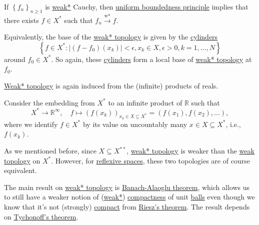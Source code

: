 \begin{note}[Completeness]
	If \(\left\{ f_n \right\}_{n \geq 1}\) is \hyperref[def:weak*-convergence]{weak*} Cauchy, then \hyperref[thm:uniform-boundedness]{uniform boundedness principle} implies that there exists \(f\in X^{\ast} \) such that \(f_n \overset{\text{w*}}{\to } f\).
\end{note}

Equivalently, the base of the \hyperref[def:weak*-topology]{weak* topology} is given by the \href{https://en.wikipedia.org/wiki/Cylinder_set}{cylinders}
\[
	\left\{ f\in X^{\ast} \colon \left\vert (f-f_0)(x_k) \right\vert < \epsilon , x_k\in X, \epsilon > 0, k = 1, \ldots , N \right\}
\]
around \(f_0\in X^{\ast}\). So again, these \href{https://en.wikipedia.org/wiki/Cylinder_set}{cylinders} form a local base of \hyperref[def:weak*-topology]{weak* topology} at \(f_0\).

\begin{remark}
	\hyperref[def:weak*-topology]{Weak* topology} is again induced from the (infinite) products of reals.
\end{remark}
\begin{explanation}
	Consider the embedding from \(X^{\ast} \) to an infinite product of \(\mathbb{R} \) such that
	\[
		X^{\ast}\to \mathbb{R} ^{\infty} ,
		\quad f\mapsto (f(x_k))_{x_k\in X\subseteq X^{\ast}} = (f(x_1), f(x_2), \ldots ),
	\]
	where we identify \(f\in X^{\ast}\) by its value on uncountably many \(x \in X \subseteq X^{\ast} \), i.e., \(f(x_k)\).
\end{explanation}

As we mentioned before, since \(X \subseteq X^{\ast\ast}\), \hyperref[def:weak*-topology]{weak* topology} is weaker than the \hyperref[def:weak-topology]{weak topology} on \(X^{\ast} \). However, for \hyperref[def:reflexive-space]{reflexive spaces}, these two topologies are of course equivalent.

The main result on \hyperref[def:weak*-topology]{weak* topology} is \hyperref[thm:Banach-Alaoglu]{Banach-Alaoglu theorem}, which allows us to still have a weaker notion of (\hyperref[def:weak*-topology]{weak*}) \hyperref[def:compact]{compactness} of unit \hyperref[def:ball]{balls} even though we know that it's not (strongly) \hyperref[def:compact]{compact} from \hyperref[thm:Riesz]{Riesz's theorem}. The result depends on \hyperref[thm:Tychonoff]{Tychonoff's theorem}.

